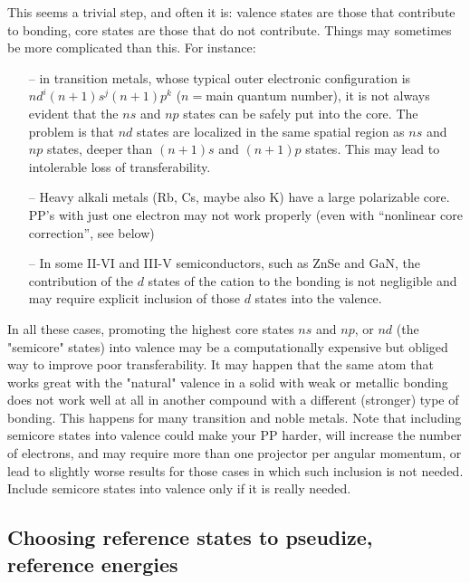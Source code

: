 This seems a trivial step, and often it is: valence states are those
that contribute to bonding, core states are those that do not
contribute. Things may sometimes be more complicated than this.
For instance:
\begin{enumerate}
\item[--] in transition metals, whose typical outer electronic
configuration is $nd^i(n+1)s^j(n+1)p^k$ ($n=$main quantum number), 
it is not
always evident that the $ns$ and $np$ states can be safely put into
the core. The problem is that $nd$ states are localized in the same
spatial region as $ns$ and $np$ states, deeper than $(n+1)s$ and
$(n+1)p$ states. This may lead to intolerable loss of transferability.
\item[--] Heavy alkali metals (Rb, Cs, maybe also K) have a large
polarizable core. PP's with just one electron may not work properly
(even with ``nonlinear core correction'', see below) 
\item[--] In some II-VI and III-V semiconductors, such as ZnSe and
GaN, the contribution of the $d$ states of the cation to the bonding 
is not negligible and may require explicit inclusion of those $d$ 
states into the valence.
\end{enumerate}
In all these cases, promoting the highest core states $ns$ and $np$,
or $nd$ (the "semicore" states) into valence may be a computationally
expensive but obliged way to improve poor transferability. It may
happen that the same atom that works great with the "natural" valence
in a solid with weak or metallic bonding does not work well at all in
another compound with a different (stronger) type of bonding. This
happens for many transition and noble metals.
Note that including semicore states into valence could make your
PP harder, will increase the number of electrons, and may require
more than one projector per angular momentum, or lead to slightly
worse results for those cases in which such inclusion is not needed. 
Include semicore states into valence only if it is really needed.

\subsection{Choosing reference states to pseudize, reference energies}

